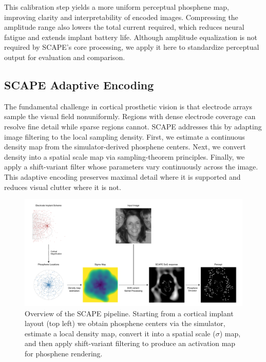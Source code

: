 This calibration step yields a more uniform perceptual phosphene map, improving clarity and interpretability of encoded images. Compressing the amplitude range also lowers the total current required, which reduces neural fatigue and extends implant battery life. Although amplitude equalization is not required by SCAPE’s core processing, we apply it here to standardize perceptual output for evaluation and comparison.



\subsection{SCAPE Adaptive Encoding}
The fundamental challenge in cortical prosthetic vision is that electrode arrays sample the visual field nonuniformly. Regions with dense electrode coverage can resolve fine detail while sparse regions cannot. SCAPE addresses this by adapting image filtering to the local sampling density. First, we estimate a continuous density map from the simulator-derived phosphene centers. Next, we convert density into a spatial scale map via sampling-theorem principles. Finally, we apply a shift-variant filter whose parameters vary continuously across the image. This adaptive encoding preserves maximal detail where it is supported and reduces visual clutter where it is not.

\begin{figure}[ht]
  \centering
  \includegraphics[width=\textwidth]{figures/SCAPElandscapeblack.pdf}
  \caption{Overview of the SCAPE pipeline. Starting from a cortical implant layout (top left) we obtain phosphene centers via the simulator, estimate a local density map, convert it into a spatial scale ($\sigma$) map, and then apply shift-variant filtering to produce an activation map for phosphene rendering.}
  \label{fig:scape_pipeline}
\end{figure}

